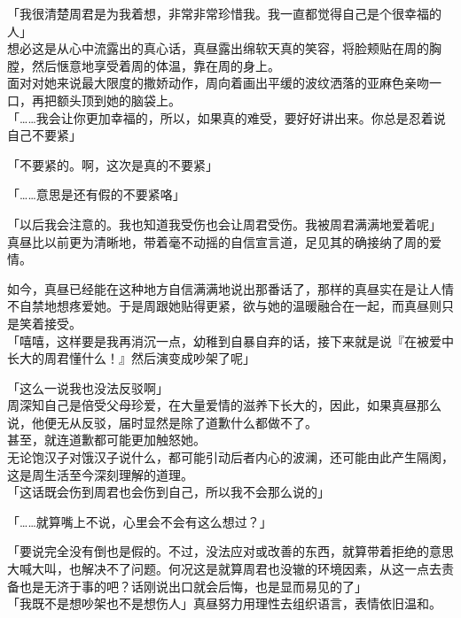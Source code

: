 「我很清楚周君是为我着想，非常非常珍惜我。我一直都觉得自己是个很幸福的人」\\

想必这是从心中流露出的真心话，真昼露出绵软天真的笑容，将脸颊贴在周的胸膛，然后惬意地享受着周的体温，靠在周的身上。\\

面对对她来说最大限度的撒娇动作，周向着画出平缓的波纹洒落的亚麻色亲吻一口，再把额头顶到她的脑袋上。\\

「……我会让你更加幸福的，所以，如果真的难受，要好好讲出来。你总是忍着说自己不要紧」

「不要紧的。啊，这次是真的不要紧」

「……意思是还有假的不要紧咯」

「以后我会注意的。我也知道我受伤也会让周君受伤。我被周君满满地爱着呢」\\

真昼比以前更为清晰地，带着毫不动摇的自信宣言道，足见其的确接纳了周的爱情。

如今，真昼已经能在这种地方自信满满地说出那番话了，那样的真昼实在是让人情不自禁地想疼爱她。于是周跟她贴得更紧，欲与她的温暖融合在一起，而真昼则只是笑着接受。\\

「嘻嘻，这样要是我再消沉一点，幼稚到自暴自弃的话，接下来就是说『在被爱中长大的周君懂什么！』然后演变成吵架了呢」

「这么一说我也没法反驳啊」\\

周深知自己是倍受父母珍爱，在大量爱情的滋养下长大的，因此，如果真昼那么说，他便无从反驳，届时显然是除了道歉什么都做不了。\\

甚至，就连道歉都可能更加触怒她。\\

无论饱汉子对饿汉子说什么，都可能引动后者内心的波澜，还可能由此产生隔阂，这是周生活至今深刻理解的道理。\\

「这话既会伤到周君也会伤到自己，所以我不会那么说的」

「……就算嘴上不说，心里会不会有这么想过？」

「要说完全没有倒也是假的。不过，没法应对或改善的东西，就算带着拒绝的意思大喊大叫，也解决不了问题。何况这是就算周君也没辙的环境因素，从这一点去责备也是无济于事的吧？话刚说出口就会后悔，也是显而易见的了」\\

「我既不是想吵架也不是想伤人」真昼努力用理性去组织语言，表情依旧温和。\\


